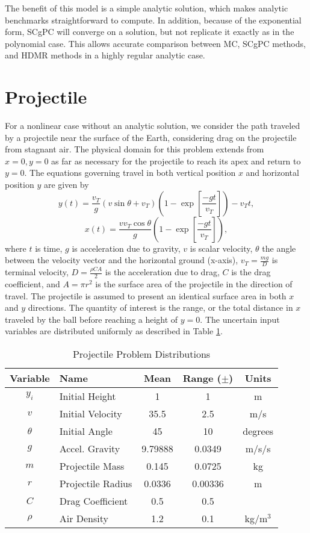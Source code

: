 The benefit of this model is a simple analytic solution, which makes analytic benchmarks straightforward to
compute.  In
addition, because of the exponential form, SCgPC will converge on a solution, but not replicate it exactly as
in the polynomial case.  This allows accurate comparison between MC, SCgPC methods, and HDMR methods in a
highly regular analytic case.




\section{Projectile}
For a nonlinear case without an analytic solution, we consider the path traveled by a projectile near the
surface of the Earth, considering drag on the projectile from stagnant air.  
The physical domain for this problem extends from $x=0,y=0$ as far as necessary for the projectile to reach
its apex and return to $y=0$.
The equations governing travel in both vertical position $x$ and horizontal position $y$
are given by
\begin{equation}
  y(t) = \frac{v_T}{g}(v\sin\theta+v_T)\left(1-\exp\left[\frac{-gt}{v_T}\right]\right)-v_T t,
\end{equation}
\begin{equation}
  x(t) = \frac{vv_T\cos\theta}{g}\left(1-\exp\left[\frac{-gt}{v_T}\right]\right),
\end{equation}
where $t$ is time, $g$ is acceleration due to gravity, $v$ is scalar velocity, $\theta$ the angle between the
velocity vector and the horizontal ground (x-axis), $v_T=\frac{mg}{D}$ is terminal velocity, $D=\frac{\rho CA}{2}$ is
the acceleration due to drag, $C$ is the drag coefficient, and $A=\pi r^2$
is the surface area of the projectile in the direction of travel.  The projectile is assumed to present an
identical surface area in both $x$ and $y$ directions.  The quantity of interest is the range, or the total
distance in $x$ traveled by the ball before reaching a height of $y=0$.  The uncertain input variables are
distributed uniformly as described in Table \ref{tab:proj dist}.

\begin{table}[h]
\centering
\begin{tabular}{c | l | c c | c}
  Variable & Name & Mean & Range ($\pm$) & Units \\\hline
  $y_i$ & Initial Height & 1 & 1 & m\\
  $v$ & Initial Velocity & 35.5 & 2.5 & m/s\\
  $\theta$ & Initial Angle & 45 & 10 & degrees\\
  $g$ & Accel. Gravity & 9.79888 & 0.0349 & m/s/s\\
  $m$ & Projectile Mass & 0.145 & 0.0725 & kg\\
  $r$ & Projectile Radius & 0.0336 & 0.00336 & m\\
  $C$ & Drag Coefficient & 0.5 & 0.5 & \\
  $\rho$ & Air Density & 1.2 & 0.1 & kg/m$^3$ \\
\end{tabular}
\caption{Projectile Problem Distributions}
\label{tab:proj dist}
\end{table}

